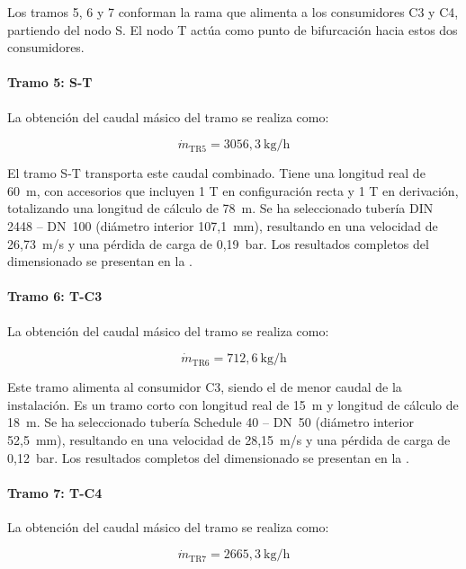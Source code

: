 \documentclass[12pt]{article}
\begin{document}
Los tramos 5, 6 y 7 conforman la rama que alimenta a los consumidores C3 y C4, partiendo del nodo S. El nodo T actúa como punto de bifurcación hacia estos dos consumidores.

\paragraph{Tramo 5: S-T}

La obtenci\'on del caudal m\'asico del tramo se realiza como:

\begin{equation}
	\dot{m}_{\text{TR5}} = 3056{,}3~\text{kg/h}
	\label{eq:caudal-tramo5}
\end{equation}

El tramo S-T transporta este caudal combinado. Tiene una longitud real de 60~m, con accesorios que incluyen 1 T en configuración recta y 1 T en derivación, totalizando una longitud de cálculo de 78~m. Se ha seleccionado tubería DIN 2448 -- DN~100 (diámetro interior 107,1~mm), resultando en una velocidad de 26,73~m/s y una pérdida de carga de 0,19~bar. Los resultados completos del dimensionado se presentan en la .

\paragraph{Tramo 6: T-C3}

La obtenci\'on del caudal m\'asico del tramo se realiza como:

\begin{equation}
	\dot{m}_{\text{TR6}} = 712{,}6~\text{kg/h}
	\label{eq:caudal-tramo6}
\end{equation}

Este tramo alimenta al consumidor C3, siendo el de menor caudal de la instalación. Es un tramo corto con longitud real de 15~m y longitud de cálculo de 18~m. Se ha seleccionado tubería Schedule 40 -- DN~50 (diámetro interior 52,5~mm), resultando en una velocidad de 28,15~m/s y una pérdida de carga de 0,12~bar. Los resultados completos del dimensionado se presentan en la .

\paragraph{Tramo 7: T-C4}

La obtenci\'on del caudal m\'asico del tramo se realiza como:

\begin{equation}
	\dot{m}_{\text{TR7}} = 2665{,}3~\text{kg/h}
	\label{eq:caudal-tramo7}
\end{equation}
\end{document}
